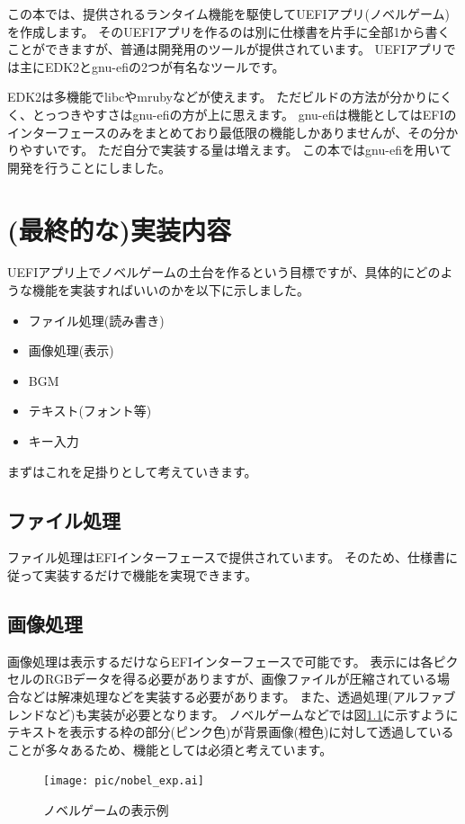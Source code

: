 \documentclass[10pt, b5paper, openany]{ltjsbook}
\begin{document}
この本では、提供されるランタイム機能を駆使してUEFIアプリ(ノベルゲーム)を作成します。
そのUEFIアプリを作るのは別に仕様書を片手に全部1から書くことができますが、普通は開発用のツールが提供されています。
UEFIアプリでは主にEDK2とgnu-efiの2つが有名なツールです。

EDK2は多機能でlibcやmrubyなどが使えます。
ただビルドの方法が分かりにくく、とっつきやすさはgnu-efiの方が上に思えます。
gnu-efiは機能としてはEFIのインターフェースのみをまとめており最低限の機能しかありませんが、その分かりやすいです。
ただ自分で実装する量は増えます。
この本ではgnu-efiを用いて開発を行うことにしました。

\chapter{(最終的な)実装内容}
UEFIアプリ上でノベルゲームの土台を作るという目標ですが、具体的にどのような機能を実装すればいいのかを以下に示しました。
\begin{itemize}
    \item ファイル処理(読み書き)
    \item 画像処理(表示)
    \item BGM
    \item テキスト(フォント等)
    \item キー入力
\end{itemize}
まずはこれを足掛りとして考えていきます。

\section{ファイル処理}
ファイル処理はEFIインターフェースで提供されています。
そのため、仕様書に従って実装するだけで機能を実現できます。

\section{画像処理}
画像処理は表示するだけならEFIインターフェースで可能です。
表示には各ピクセルのRGBデータを得る必要がありますが、画像ファイルが圧縮されている場合などは解凍処理などを実装する必要があります。
また、透過処理(アルファブレンドなど)も実装が必要となります。
ノベルゲームなどでは図\ref{fig:nobel_exp}に示すようにテキストを表示する枠の部分(ピンク色)が背景画像(橙色)に対して透過していることが多々あるため、機能としては必須と考えています。
\begin{figure}[H]
    \centering
    \texttt{[image: pic/nobel\_exp.ai]}
    \caption{ノベルゲームの表示例}
    \label{fig:nobel_exp}
\end{figure}
\end{document}
